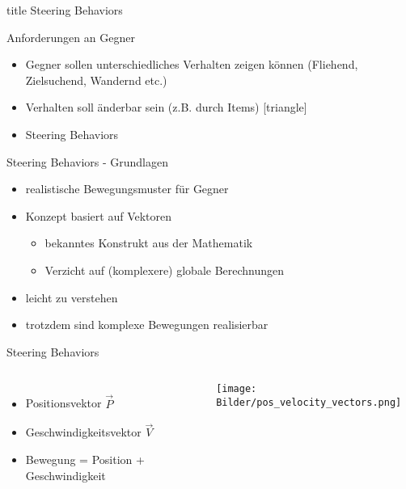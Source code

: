 \begin{frame}
\vfill
\centering
\begin{beamercolorbox}[sep=8pt,center,shadow=true,rounded=true]{title}
Steering Behaviors
\end{beamercolorbox}
\vfill
\end{frame}

\begin{frame}{Anforderungen an Gegner}
\begin{itemize}
    \item Gegner sollen unterschiedliches Verhalten zeigen können (Fliehend, Zielsuchend, Wandernd etc.)
    \item Verhalten soll änderbar sein (z.B. durch Items)
    \newline
    [triangle]
    \item Steering Behaviors
\end{itemize}
\end{frame}
\begin{frame}{Steering Behaviors - Grundlagen}
\begin{itemize}
\item realistische Bewegungsmuster für Gegner
\item Konzept basiert auf Vektoren
\begin{itemize}
    \item bekanntes Konstrukt aus der Mathematik
    \item Verzicht auf (komplexere) globale Berechnungen
\end{itemize}
\item leicht zu verstehen
\item trotzdem sind komplexe Bewegungen realisierbar
\end{itemize}
\end{frame}
\begin{frame}{Steering Behaviors}
\begin{columns}
\begin{itemize}
    \item Positionsvektor $\vec{P}$
    \item Geschwindigkeitsvektor $\vec{V}$
    \item Bewegung = Position + Geschwindigkeit
\end{itemize}
\texttt{[image: Bilder/pos\_velocity\_vectors.png]}
\end{columns}
\end{frame}
